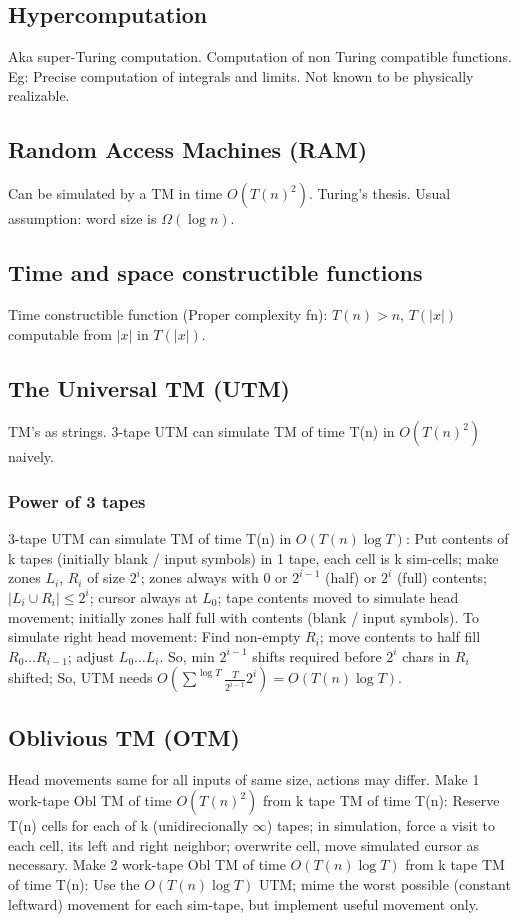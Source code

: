 \documentclass[oneside, article]{memoir}
\begin{document}
\subsection{Hypercomputation}
Aka super-Turing computation. Computation of non Turing compatible functions. Eg: Precise computation of integrals and limits. Not known to be physically realizable.

\subsection{Random Access Machines (RAM)}
Can be simulated by a TM in time $O(T(n)^{2})$. Turing's thesis. Usual assumption: word size is $\Omega(\log n)$.

\subsection{Time and space constructible functions}
Time constructible function (Proper complexity fn): $T(n)>n$, $T(|x|)$ computable from $|x|$ in $T(|x|)$.

\subsection{The Universal TM (UTM)}
TM's as strings. 3-tape UTM can simulate TM of time T(n) in $O(T(n)^{2})$ naively.

\subsubsection{Power of 3 tapes}
3-tape UTM can simulate TM of time T(n) in $O(T(n)\log T)$: Put contents of k tapes (initially blank / input symbols) in 1 tape, each cell is k sim-cells; make zones $L_{i}$, $R_{i}$ of size $2^{i}$; zones always with 0 or $2^{i-1}$ (half) or $2^{i}$ (full) contents; $|L_{i} \cup R_{i}| \leq 2^{i}$; cursor always at $L_{0}$; tape contents moved to simulate head movement; initially zones half full with contents (blank / input symbols). To simulate right head movement: Find non-empty $R_{i}$; move contents to half fill $R_{0} \dots R_{i-1}$; adjust $L_{0} \dots L_{i}$. So, min $2^{i-1}$ shifts required before $2^{i}$ chars in $R_{i}$ shifted; So, UTM needs $O(\sum^{\log T} \frac{T}{2^{i-1}}2^{i}) = O(T(n)\log T)$.

\subsection{Oblivious TM (OTM)}
Head movements same for all inputs of same size, actions may differ. Make 1 work-tape Obl TM of time $O(T(n)^{2})$ from k tape TM of time T(n): Reserve T(n) cells for each of k (unidirecionally $\infty$) tapes; in simulation, force a visit to each cell, its left and right neighbor; overwrite cell, move simulated cursor as necessary. Make 2 work-tape Obl TM of time $O(T(n)\log T)$ from k tape TM of time T(n): Use the $O(T(n)\log T)$ UTM; mime the worst possible (constant leftward) movement for each sim-tape, but implement useful movement only.
\end{document}
